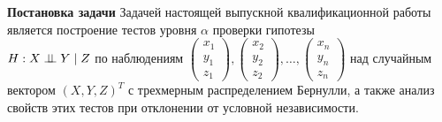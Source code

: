 \textbf{Постановка задачи} \quad
Задачей настоящей выпускной квалификационной работы 
является построение тестов уровня $\alpha$ 
проверки гипотезы \\ $H: X \perp\!\!\!\perp Y \mid Z$
по наблюдениям
$
\begin{pmatrix}
    x_1 \\
    y_1 \\
    z_1
\end{pmatrix},
\begin{pmatrix}
    x_2 \\
    y_2 \\
    z_2
\end{pmatrix}, \ldots,
\begin{pmatrix}
    x_n \\
    y_n \\
    z_n
\end{pmatrix}
$ над случайным вектором $(X,Y,Z)^T$ с
трехмерным распределением Бернулли, а также
анализ свойств этих тестов при отклонении от условной независимости.
